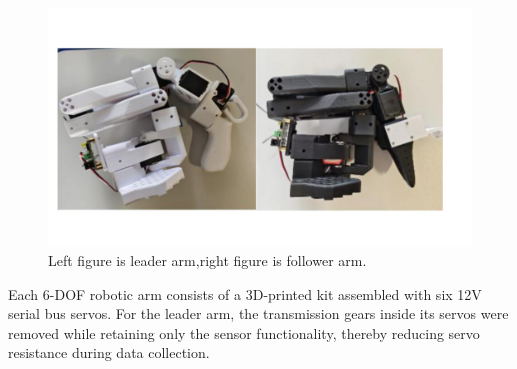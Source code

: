 \documentclass[runningheads]{llncs}
\begin{document}
\begin{figure}
\includegraphics[width=\textwidth]{fig3.pdf}
\caption{Left figure is leader arm,right figure is follower arm.} \label{fig2-1}
\end{figure}


Each 6-DOF robotic arm consists of a 3D-printed kit assembled with six 12V serial bus servos. For the leader arm, the transmission gears inside its servos were removed while retaining only the sensor functionality, thereby reducing servo resistance during data collection.
\end{document}
